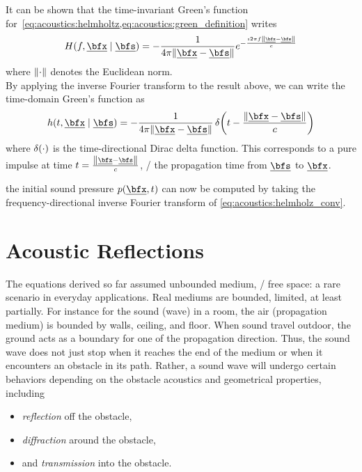 It can be shown \cite{Kutruff} that the time-invariant Green's function for~\cref{eq:acoustics:helmholtz,eq:acoustics:green_definition} writes
\begin{equation}
    \label{eq:acoustics:greenFreeFreq}
    H(f, \positionMicrophone \mid \positionSource) = - \frac{1}{4 \pi \norm{\positionMicrophone - \positionSource}} e^{- \frac{\Ii 2 \pi f \norm{\positionMicrophone - \positionSource}}{\speedOfSound}}
\end{equation}
where $\norm{\cdot}$ denotes the Euclidean norm.
\\By applying the inverse Fourier transform to the result above, we can write the time-domain Green's function as
\begin{equation}
    \label{eq:acoustics:greenFreeTime}
    h(t, \positionMicrophone \mid \positionSource) =
        - \frac{1}{4 \pi \norm{\positionMicrophone - \positionSource}}
        \diracOf{t - \frac{\norm{\positionMicrophone - \positionSource}}{\speedOfSound}}
\end{equation}
where $\diracOf{\cdot}$ is the time-directional Dirac delta function.
This corresponds to a pure impulse at time $t = \tfrac{\norm{\positionMicrophone - \positionSource}}{\speedOfSound}$,
\ie/ the propagation time from $\positionSource$ to $\positionMicrophone$.

 the initial sound pressure $\pressureSpaceTime$ can now be computed by taking the frequency-directional inverse Fourier transform of \cref{eq:acoustics:helmholz_conv}.


\section{Acoustic Reflections}

The equations derived so far assumed unbounded medium, \ie/ free space: a rare scenario in everyday applications.
Real mediums are bounded, limited, at least partially.
For instance for the sound (wave) in a room, the air (propagation medium) is bounded by walls, ceiling, and floor.
When sound travel outdoor, the ground acts as a boundary for one of the propagation direction.
Thus, the sound wave does not just stop when it reaches the end of the medium or when it encounters an obstacle in its path.
Rather, a sound wave will undergo certain behaviors depending on the obstacle acoustics and geometrical properties, including
\begin{itemize}
    \item \textit{reflection} off the obstacle,
    \item \textit{diffraction} around the obstacle,
    \item and \textit{transmission} into the obstacle.
\end{itemize}

